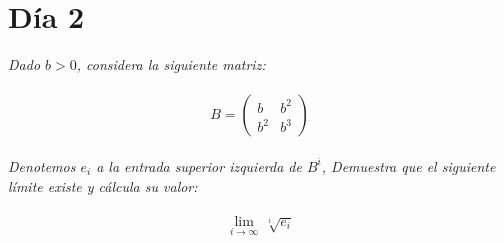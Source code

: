 \documentclass[11pt]{article}
\begin{document}
\section*{D\'ia 2}
\begin{tcolorbox}[
	title = \textcolor{black}{\textbf{\textcolor{white}{Problema 4\,\,(\'Algebra lineal y Sucesiones)}}},
	]
\textit{Dado $b>0$, considera la siguiente matriz:}\,\\
\,\\
\begin{equation*}
    B=\begin{pmatrix}
        b&b^2\\
        b^2&b^3
    \end{pmatrix}
\end{equation*}\,\\
\textit{Denotemos $e_i$ a la entrada superior izquierda de $B^i$, Demuestra que el siguiente l\'imite existe y c\'alcula su valor:}\,\\
\,\\
\begin{equation*}
    \lim_{i\rightarrow \infty}\,\sqrt[i]{e_i}
\end{equation*}
\end{tcolorbox}
\end{document}
